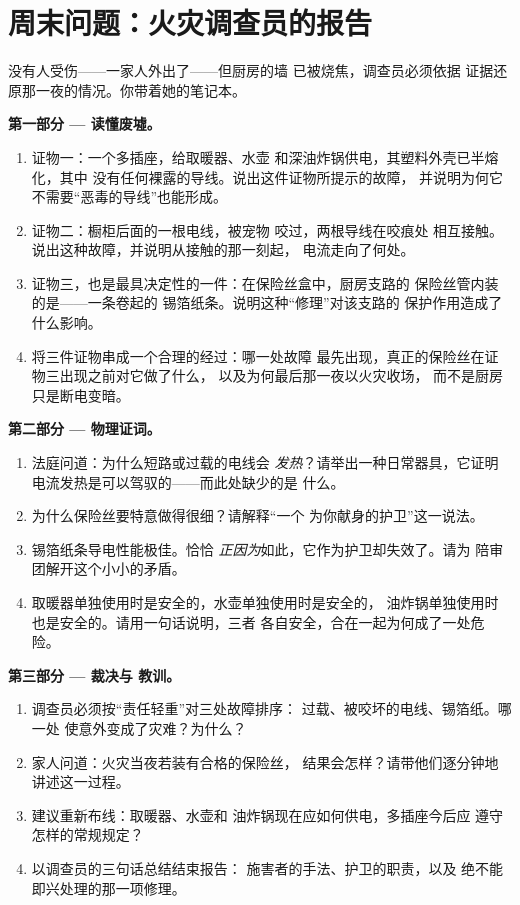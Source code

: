 \section{周末问题：火灾调查员的报告}

\begin{problem}\label{pb:g7:short-circuits-safety:1}
没有人受伤——一家人外出了——但厨房的墙
已被烧焦，调查员必须依据
证据还原那一夜的情况。你带着她的笔记本。

\medskip\noindent\textbf{第一部分 --- 读懂废墟。}
\begin{enumerate}
  \item 证物一：一个多插座，给取暖器、水壶
        和深油炸锅供电，其塑料外壳已半熔化，其中
        没有任何裸露的导线。说出这件证物所提示的故障，
        并说明为何它不需要“恶毒的导线”也能形成。
  \item 证物二：橱柜后面的一根电线，被宠物
        咬过，两根导线在咬痕处
        相互接触。说出这种故障，并说明从接触的那一刻起，
        电流走向了何处。
  \item 证物三，也是最具决定性的一件：在保险丝盒中，厨房支路的
        保险丝管内装的是——一条卷起的
        锡箔纸条。说明这种“修理”对该支路的
        保护作用造成了什么影响。
  \item 将三件证物串成一个合理的经过：哪一处故障
        最先出现，真正的保险丝在证物三出现之前对它做了什么，
        以及为何最后那一夜以火灾收场，
        而不是厨房只是断电变暗。
\end{enumerate}

\medskip\noindent\textbf{第二部分 --- 物理证词。}
\begin{enumerate}[resume]
  \item 法庭问道：为什么短路或过载的电线会
        \emph{发热}？请举出一种日常器具，它证明
        电流发热是可以驾驭的——而此处缺少的是
        什么。
  \item 为什么保险丝要特意做得很细？请解释“一个
        为你献身的护卫”这一说法。
  \item 锡箔纸条导电性能极佳。恰恰
        \emph{正因为}如此，它作为护卫却失效了。请为
        陪审团解开这个小小的矛盾。
  \item 取暖器单独使用时是安全的，水壶单独使用时是安全的，
        油炸锅单独使用时也是安全的。请用一句话说明，三者
        各自安全，合在一起为何成了一处危险。
\end{enumerate}

\medskip\noindent\textbf{第三部分 --- 裁决与
教训。}
\begin{enumerate}[resume]
  \item 调查员必须按“责任轻重”对三处故障排序：
        过载、被咬坏的电线、锡箔纸。哪一处
        使意外变成了灾难？为什么？
  \item 家人问道：火灾当夜若装有合格的保险丝，
        结果会怎样？请带他们逐分钟地
        讲述这一过程。
  \item 建议重新布线：取暖器、水壶和
        油炸锅现在应如何供电，多插座今后应
        遵守怎样的常规规定？
  \item 以调查员的三句话总结结束报告：
        施害者的手法、护卫的职责，以及
        绝不能即兴处理的那一项修理。
\end{enumerate}
\end{problem}
